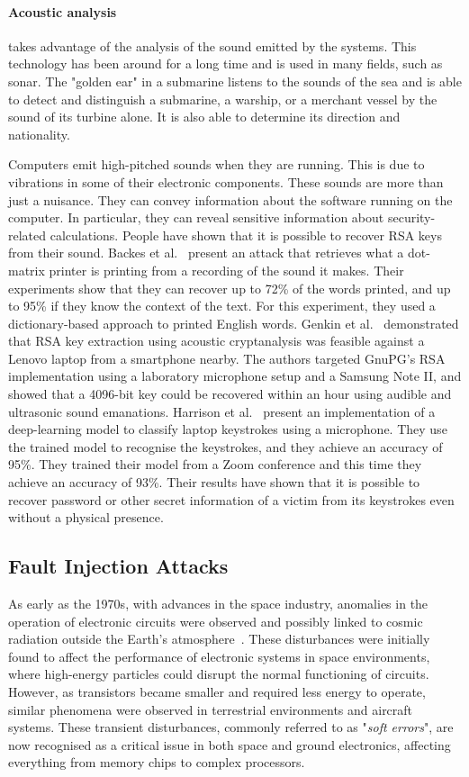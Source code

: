 \paragraph{Acoustic analysis} takes advantage of the analysis of the sound emitted by the systems. This technology has been around for a long time and is used in many fields, such as sonar. The "golden ear" in a submarine listens to the sounds of the sea and is able to detect and distinguish a submarine, a warship, or a merchant vessel by the sound of its turbine alone. It is also able to determine its direction and nationality.

Computers emit high-pitched sounds when they are running. This is due to vibrations in some of their electronic components. These sounds are more than just a nuisance. They can convey information about the software running on the computer. In particular, they can reveal sensitive information about security-related calculations. People have shown that it is possible to recover RSA keys from their sound.
Backes et al.~\cite{BDGPS-10-usenix} present an attack that retrieves what a dot-matrix printer is printing from a recording of the sound it makes. Their experiments show that they can recover up to 72\% of the words printed, and up to 95\% if they know the context of the text. For this experiment, they used a dictionary-based approach to printed English words.
Genkin et al.~\cite{GST-17-crypto} demonstrated that RSA key extraction using acoustic cryptanalysis was feasible against a Lenovo laptop from a smartphone nearby. The authors targeted GnuPG's RSA implementation using a laboratory microphone setup and a Samsung Note II, and showed that a 4096-bit key could be recovered within an hour using audible and ultrasonic sound emanations. Harrison et al.~\cite{HTM-23-eurospw} present an implementation of a deep-learning model to classify laptop keystrokes using a microphone. They use the trained model to recognise the keystrokes, and they achieve an accuracy of 95\%. They trained their model from a Zoom conference and this time they achieve an accuracy of 93\%. Their results have shown that it is possible to recover password or other secret information of a victim from its keystrokes even without a physical presence.

\subsection{Fault Injection Attacks}
As early as the 1970s, with advances in the space industry, anomalies in the operation of electronic circuits were observed and possibly linked to cosmic radiation outside the Earth's atmosphere~\cite{BSH-75-tns,Z-96-ibm,ZL-79-science}. These disturbances were initially found to affect the performance of electronic systems in space environments, where high-energy particles could disrupt the normal functioning of circuits. However, as transistors became smaller and required less energy to operate, similar phenomena were observed in terrestrial environments and aircraft systems. These transient disturbances, commonly referred to as "\textit{soft errors}", are now recognised as a critical issue in both space and ground electronics, affecting everything from memory chips to complex processors.

